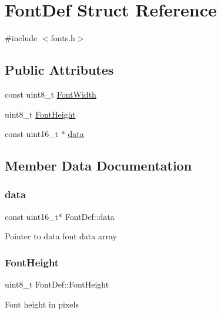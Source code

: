 \hypertarget{structFontDef}{}\section{Font\+Def Struct Reference}
\label{structFontDef}


{\ttfamily \#include $<$fonts.\+h$>$}

\subsection*{Public Attributes}
\begin{DoxyCompactItemize}
\item 
const uint8\+\_\+t \hyperlink{structFontDef_a9e22d0bdbc21eadba6155f31d742f85f}{Font\+Width}
\item 
uint8\+\_\+t \hyperlink{structFontDef_a4e3e31a3a441bc010a432564e5da887d}{Font\+Height}
\item 
const uint16\+\_\+t $\ast$ \hyperlink{structFontDef_a864722845b4def15a6c53bdc4e94a24a}{data}
\end{DoxyCompactItemize}


\subsection{Member Data Documentation}
\mbox{\label{structFontDef_a864722845b4def15a6c53bdc4e94a24a}} 
\subsubsection{\texorpdfstring{data}{data}}
{\footnotesize\ttfamily const uint16\+\_\+t$\ast$ Font\+Def\+::data}

Pointer to data font data array \mbox{\label{structFontDef_a4e3e31a3a441bc010a432564e5da887d}} 
\subsubsection{\texorpdfstring{Font\+Height}{FontHeight}}
{\footnotesize\ttfamily uint8\+\_\+t Font\+Def\+::\+Font\+Height}

Font height in pixels \mbox{\label{structFontDef_a9e22d0bdbc21eadba6155f31d742f85f}} 
